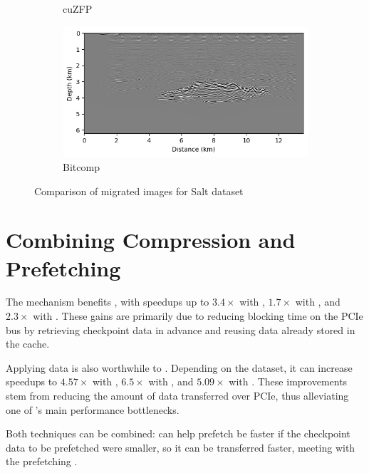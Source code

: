 \documentclass[Ingles]{ic-tese-v3}
\begin{document}
\begin{figure}[]
\begin{subfigure}{0.49\textwidth}
        \caption{cuZFP}
        \label{fig:render_cuzfp_salt}
    \end{subfigure}
    \hfill
    \begin{subfigure}{0.49\textwidth}
        \includegraphics[width=\textwidth,trim={4px 0 0 0}, clip]{figures/quality/render_bitcomp_salt.png}
        \caption{Bitcomp}
        \label{fig:render_bitcomp_salt}%
    \end{subfigure}
    \hfill
    \caption[Comparison of migrated images for Salt dataset]{Comparison of migrated images for Salt dataset}
    \label{fig:quality}
\end{figure}




\chapter{Combining Compression and Prefetching}
\label{ch:comppref}

The \checkpointprefetching mechanism benefits \awave, with speedups up to $3.4\times$ with \revolve, $1.7\times$ with \zcut, and $2.3\times$ with \uniform. These gains are primarily due to reducing blocking time on the PCIe bus by retrieving checkpoint data in advance and reusing data already stored in the cache.

Applying \checkpointing data \compression is also worthwhile to \awave. Depending on the dataset, it can increase speedups to $4.57\times$ with \revolve, $6.5\times$ with \zcut, and $5.09\times$ with \uniform. These improvements stem from reducing the amount of data transferred over PCIe, thus alleviating one of \awave's main performance bottlenecks.

Both techniques can be combined: \compression can help prefetch be faster if the checkpoint data to be prefetched were smaller, so it can be transferred faster, meeting with the prefetching .
\end{document}
